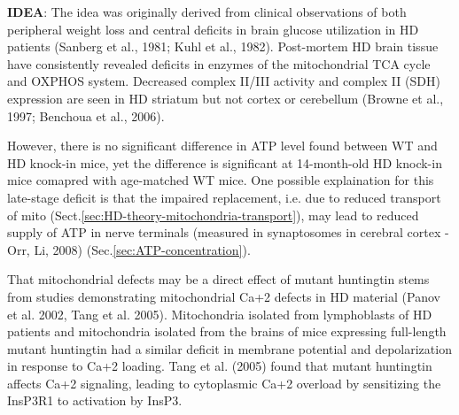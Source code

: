 {\bf IDEA}:  The idea was originally derived from clinical observations of both
peripheral weight loss and central deficits in brain glucose utilization in HD
patients (Sanberg et al., 1981; Kuhl et al., 1982). Post-mortem HD brain tissue
have consistently revealed deficits in enzymes of the mitochondrial TCA cycle
and OXPHOS system. Decreased complex II/III activity and complex II (SDH)
expression are seen in HD striatum but not cortex or cerebellum (Browne et al.,
1997; Benchoua et al., 2006).

However, there is no significant difference in ATP level found between WT and HD
knock-in mice, yet the difference is significant at 14-month-old HD knock-in
mice comapred with age-matched WT mice. One possible explaination for this
late-stage deficit is that the impaired replacement, i.e.
due to reduced transport of mito
(Sect.\ref{sec:HD-theory-mitochondria-transport}), may lead to reduced supply of
ATP in nerve terminals (measured in synaptosomes in cerebral cortex - Orr, Li,
2008) (Sec.\ref{sec:ATP-concentration}).

That mitochondrial defects may be a direct effect of mutant huntingtin stems
from studies demonstrating mitochondrial Ca+2 defects in HD material (Panov et
al. 2002, Tang et al. 2005).
Mitochondria isolated from lymphoblasts of HD patients and mitochondria isolated
from the brains of mice expressing full-length mutant huntingtin had a similar
deficit in membrane potential and depolarization in response to Ca+2 loading.
Tang et al. (2005) found that mutant huntingtin affects Ca+2 signaling, leading
to cytoplasmic Ca+2 overload by sensitizing the InsP3R1 to activation by InsP3.

